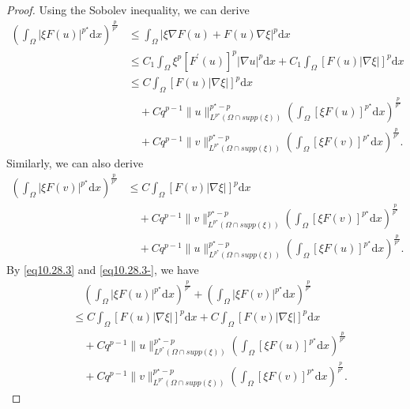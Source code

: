 \documentclass[12pt]{amsart}
\theoremstyle{definition}
\theoremstyle{remark}
\theoremstyle{conclusion}
\theoremstyle{conjecture}
\numberwithin{equation}{section}
\begin{document}
\begin{proof}
Using the Sobolev inequality, we can derive
\begin{align}\label{eq10.28.3}
\left( \int_{\Omega} |\xi F(u)|^{p^{\star}}\mathrm{d}x  \right)^\frac{p}{p^{\star}} &\leq \int_{\Omega} |\xi \nabla F(u) + F(u) \nabla\xi|^p \mathrm{d}x \\
&\leq C_1 \int_{\Omega} \xi^p  [F^\prime(u)]^p |\nabla u|^p \mathrm{d}x + C_1 \int_{\Omega}  [F(u) |\nabla \xi|]^p \mathrm{d}x \nonumber\\
& \leq C \int_{\Omega}  [F(u) |\nabla \xi|]^p \mathrm{d}x \nonumber\\
& \quad+ Cq^{p-1}\|u\|_{L^{p^{\star}}(\Omega\cap supp(\xi))}^{p^{\star}-p}\left(\int_{\Omega} [\xi F(u)]^{p^{\star}} \mathrm{d}x\right)^\frac{p}{p^{\star}}\nonumber \\
& \quad+Cq^{p-1}\|v\|_{L^{p^{\star}}(\Omega\cap supp(\xi))}^{p^{\star}-p} \left(\int_{\Omega} [\xi F(v)]^{p^{\star}} \mathrm{d}x\right)^\frac{p}{p^{\star}}. \nonumber
\end{align}
Similarly, we can also derive
\begin{align}\label{eq10.28.3-}
    \left( \int_{\Omega} |\xi F(v)|^{p^{\star}}\mathrm{d}x  \right)^\frac{p}{p^{\star}} & \leq C \int_{\Omega}  [F(v) |\nabla \xi|]^p \mathrm{d}x \\
& \quad+ Cq^{p-1}\|v\|_{L^{p^{\star}}(\Omega\cap supp(\xi))}^{p^{\star}-p}\left(\int_{\Omega} [\xi F(v)]^{p^{\star}} \mathrm{d}x\right)^\frac{p}{p^{\star}}\nonumber \\
& \quad+Cq^{p-1}\|u\|_{L^{p^{\star}}(\Omega\cap supp(\xi))}^{p^{\star}-p} \left(\int_{\Omega} [\xi F(u)]^{p^{\star}} \mathrm{d}x\right)^\frac{p}{p^{\star}}.\nonumber
\end{align}
By \eqref{eq10.28.3} and \eqref{eq10.28.3-}, we have
\begin{align}\label{loc_bound}
    & \quad \left( \int_{\Omega} |\xi F(u)|^{p^{\star}}\mathrm{d}x  \right)^\frac{p}{p^{\star}} +\left( \int_{\Omega} |\xi F(v)|^{p^{\star}}\mathrm{d}x  \right)^\frac{p}{p^{\star}}\\
    &\leq C \int_{\Omega}  [F(u) |\nabla \xi|]^p \mathrm{d}x+  C \int_{\Omega}  [F(v) |\nabla \xi|]^p \mathrm{d}x \nonumber\\
    & \quad+ Cq^{p-1}\|u\|_{L^{p^{\star}}(\Omega\cap supp(\xi))}^{p^{\star}-p}\left(\int_{\Omega} [\xi F(u)]^{p^{\star}} \mathrm{d}x\right)^\frac{p}{p^{\star}}\nonumber \\
& \quad+Cq^{p-1}\|v\|_{L^{p^{\star}}(\Omega\cap supp(\xi))}^{p^{\star}-p} \left(\int_{\Omega} [\xi F(v)]^{p^{\star}} \mathrm{d}x\right)^\frac{p}{p^{\star}}.\nonumber

\end{align}
\end{proof}
\end{document}
